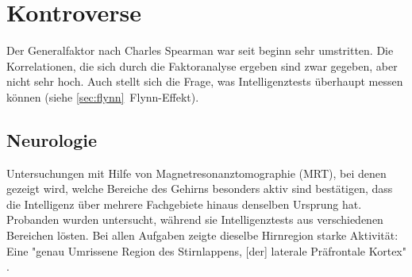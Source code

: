 \cite{wiki_intheorie}

\section{Kontroverse}
Der Generalfaktor nach Charles Spearman war seit beginn sehr umstritten. Die Korrelationen, die sich durch die Faktoranalyse ergeben sind zwar gegeben, aber nicht sehr hoch. Auch stellt sich die Frage, was Intelligenztests überhaupt messen können (siehe \ref{sec:flynn}~Flynn-Effekt).


\subsection{Neurologie}
Untersuchungen mit Hilfe von Magnetresonanztomographie (MRT), bei denen gezeigt wird, welche Bereiche des Gehirns besonders aktiv sind bestätigen, dass die Intelligenz über mehrere Fachgebiete hinaus denselben Ursprung hat.
Probanden wurden untersucht, während sie Intelligenztests aus verschiedenen Bereichen lösten. Bei allen Aufgaben zeigte dieselbe Hirnregion starke Aktivität: Eine "genau Umrissene Region des Stirnlappens, [der] laterale Präfrontale Kortex" \cite{geok15}.

